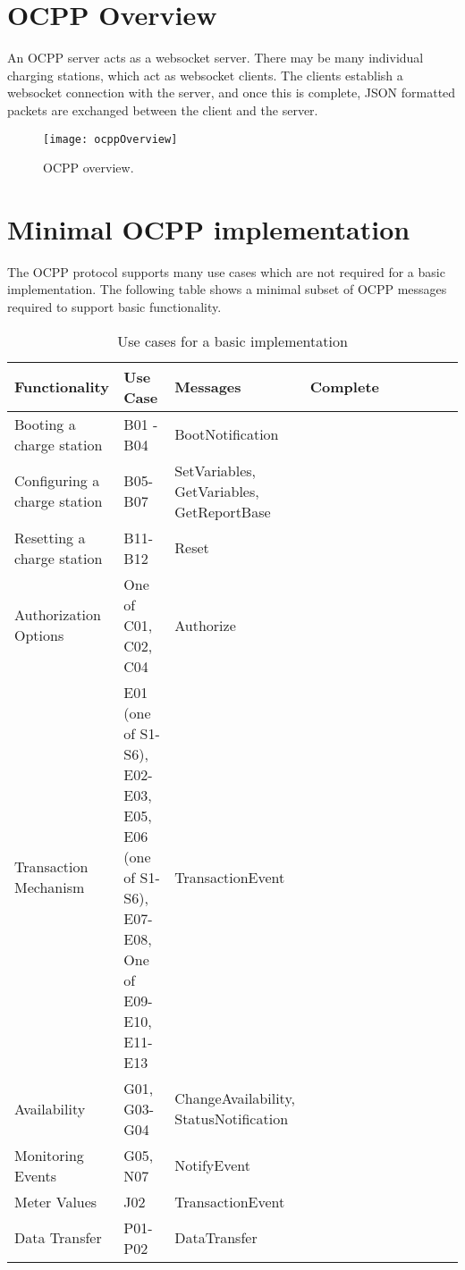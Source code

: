 \documentclass[12pt,openany,a4paper]{book}
\begin{document}
\section{OCPP Overview}
An OCPP server acts as a websocket server. There may be many individual charging stations, which act as websocket clients. The clients establish a websocket connection with the server, and once this is complete, JSON formatted packets are exchanged between the client and the server.
\begin{center}

\begin{figure}
\texttt{[image: ocppOverview]}
\caption{OCPP overview.}
\end{figure}

\end{center}


\section{Minimal OCPP implementation}
The OCPP protocol supports many use cases which are not required for a basic implementation. The following table \cite{ocpp} shows a minimal subset of OCPP messages required to support basic functionality.\\

\begin{table}[htp]
\caption{Use cases for a basic implementation}
\begin{tabular}{ |p{4cm}|p{3cm}|p{4cm}|p{2cm}| p{1.5cm}|p{1.5cm}|p{1.5cm}|p{1cm}|p{1cm} }
 \hline
Functionality & 
Use Case & 
Messages &
Complete
\\
 \hline
Booting a charge station& B01 - B04& BootNotification & \cellcolor{green} \\
 \hline
Configuring a charge station & B05-B07 & SetVariables, GetVariables, GetReportBase & \cellcolor{green} \\
 \hline
Resetting a charge station& B11-B12 & Reset & \\
 \hline
Authorization Options& One of C01, C02, C04 & Authorize &\\
 \hline
Transaction Mechanism & E01 (one of S1-S6), E02-E03,
E05, E06 (one of S1-S6), E07-
E08, One of E09-E10, E11-E13 & TransactionEvent & \\
 \hline
Availability& G01, G03-G04& ChangeAvailability, StatusNotification &\\
 \hline
Monitoring Events& G05, N07 & NotifyEvent & \\
 \hline
Meter Values & J02 & TransactionEvent & \\
 \hline
Data Transfer& P01-P02 & DataTransfer & \\
 \hline
\end{tabular}
\end{table}
\end{document}
